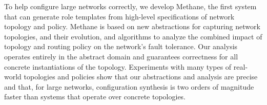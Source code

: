 \documentclass[numbers, 10pt, preprint]{sigplanconf}
\newcommand{\sysname}{{\small \sf Methane}\xspace}
\begin{document}
To help configure large networks correctly, we develop \sysname, the first system that can generate role templates from high-level specifications of network topology and policy. \sysname is based on new abstractions for capturing network topologies, and their evolution, and algorithms to analyze the combined impact of topology and routing policy on the network's fault tolerance. Our analysis operates entirely in the abstract domain and guarantees correctness for all concrete instantiations of the topology. Experiments with many types of real-world topologies and policies show that our abstractions and analysis are precise and that, for large networks, configuration synthesis is two orders of magnitude faster than systems that operate over concrete topologies.


%
%
%
%

\balance






%
%
%
%
\end{document}
